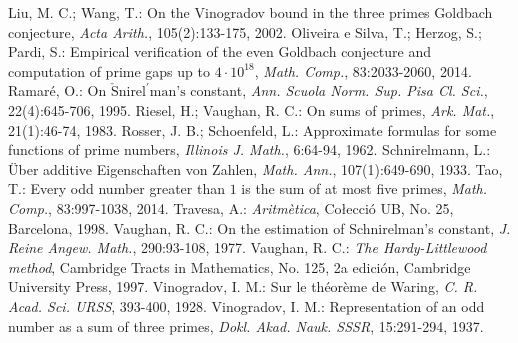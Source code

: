 \documentclass[11pt,a4paper,openright,oneside]{article}
\numberwithin{equation}{section}
\theoremstyle{definition}
\begin{document}
\begin{thebibliography}{25}
     Liu, M. C.; Wang, T.: On the Vinogradov bound in the three primes Goldbach conjecture, \textit{Acta Arith.}, 105(2):133-175, 2002.
     Oliveira e Silva, T.; Herzog, S.; Pardi, S.: Empirical verification of the even Goldbach conjecture and computation of prime gaps up to $4\cdot10^{18}$, \textit{Math. Comp.}, 83:2033-2060, 2014.
     Ramar\'e, O.: On $\check{\text{S}}\text{nirel}^{\prime} \text{man's}$ constant, \textit{Ann. Scuola Norm. Sup. Pisa Cl. Sci.}, 22(4):645-706, 1995.
     Riesel, H.; Vaughan, R. C.: On sums of primes, \textit{Ark. Mat.}, 21(1):46-74, 1983.
     Rosser, J. B.; Schoenfeld, L.: Approximate formulas for some functions of prime numbers, \textit{Illinois J. Math.}, 6:64-94, 1962.
     Schnirelmann, L.: \"Uber additive Eigenschaften von Zahlen, \textit{Math. Ann.}, 107(1):649-690, 1933.
     Tao, T.: Every odd number greater than $1$ is the sum of at most five primes, \textit{Math. Comp.}, 83:997-1038, 2014.
     Travesa, A.: \textit{Aritm\`etica}, Co{\l}ecci\'o UB, No. 25, Barcelona, 1998.
     Vaughan, R. C.: On the estimation of Schnirelman's constant, \textit{J. Reine Angew. Math.}, 290:93-108, 1977.
     Vaughan, R. C.: \textit{The Hardy-Littlewood method}, Cambridge Tracts in Mathematics, No. 125, 2a edici\'on, Cambridge University Press, 1997.
     Vinogradov, I. M.: Sur le th\'eor\`eme de Waring, \textit{C. R. Acad. Sci. URSS}, 393-400, 1928.
     Vinogradov, I. M.: Representation of an odd number as a sum of three primes, \textit{Dokl. Akad. Nauk. SSSR}, 15:291-294, 1937.
\end{thebibliography}
\end{document}
